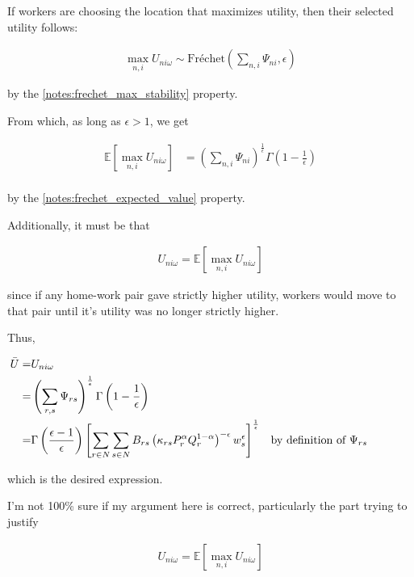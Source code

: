 \documentclass[10pt]{article}
\begin{document}
If workers are choosing the location that maximizes utility, 
then their selected utility follows:

\begin{align}
    \max_{n, i} U_{n i \omega} \sim \text{Fréchet}\left(\sum_{n, i} \Psi_{n i}, \epsilon\right)
\end{align}

by the \autoref{notes:frechet_max_stability} property.

From which, as long as $\epsilon > 1$, we get

\begin{align}
    \mathbb{E}[ \max_{n, i} U_{n i \omega}] &= \left(\sum_{n, i} \Psi_{n i}\right)^{\frac{1}{\epsilon}} \Gamma\left(1-\frac{1}{\epsilon}\right) \\
\end{align}

by the \autoref{notes:frechet_expected_value} property.

Additionally, it must be that

\begin{align}
    U_{n i \omega}= \mathbb{E}[ \max_{n, i} U_{n i \omega}]
\end{align}

since if any home-work pair gave strictly higher 
utility, workers would move to that pair until 
it's utility was no longer strictly higher.

Thus, 

\begin{align}
    \bar{U} =  &U_{n i \omega}  \\ 
    = &\left(\sum_{r, s} \Psi_{r s}\right)^{\frac{1}{\epsilon}} \Gamma\left(1-\frac{1}{\epsilon}\right) \\
    = &\Gamma\left(\frac{\epsilon-1}{\epsilon}\right)\left[\sum_{r \in N} \sum_{s \in N} B_{r s}\left(\kappa_{r s} P_r^\alpha Q_r^{1-\alpha}\right)^{-\epsilon} w_s^\epsilon\right]^{\frac{1}{\epsilon}} && \parbox[t]{4cm}{\raggedright by definition of $\Psi_{rs}$} \\
\end{align}

which is the desired expression.

\begin{questions}
    I'm not 100\% sure if my argument here is correct, particularly 
    the part trying to justify

    \begin{align}
        U_{n i \omega}=\mathbb{E}\left[\max _{n, i} U_{n i \omega}\right]
    \end{align}
\end{questions}
\end{document}
